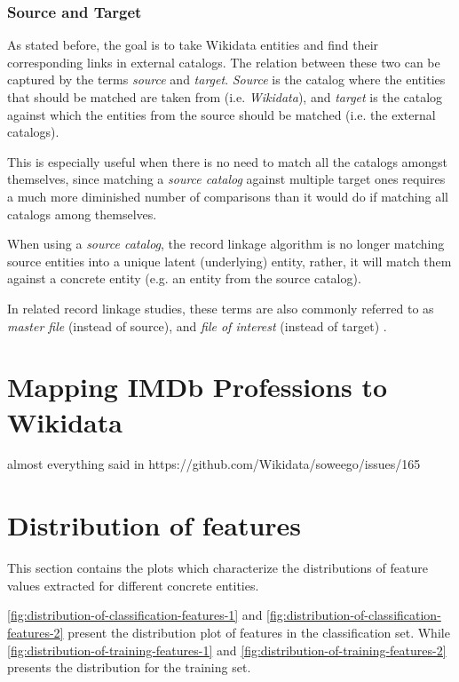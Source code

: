 \documentclass[epsfig,a4paper,11pt,titlepage,twoside,openany]{book}
\begin{document}
\subsubsection{Source and Target}
\label{sec:rl-term-source-and-target}

As stated before, the goal is to take Wikidata entities and find their corresponding links in external catalogs. The relation between these two can be captured by the terms \textit{source} and \textit{target}. \textit{Source} is the catalog where the entities that should be matched are taken from (i.e. \textit{Wikidata}), and \textit{target} is the catalog against which the entities from the source should be matched (i.e. the external catalogs).

This is especially useful when there is no need to match all the catalogs amongst
themselves, since matching a \textit{source catalog} against multiple target ones
requires a much more diminished number of comparisons than it would do if matching all catalogs among themselves.

When using a \textit{source catalog}, the record linkage algorithm is no longer matching
source entities into a unique latent (underlying) entity, rather, it will match
them against a concrete entity (e.g. an entity from the source catalog).

In related record linkage studies, these terms are also commonly referred to as \cite{Sayers2015}
\textit{master file} (instead of source), and \textit{file of interest} (instead
of target) .
   

\section{Mapping IMDb Professions to Wikidata}
\label{sec:imdb-profs-to-wikidata}

almost everything said in https://github.com/Wikidata/soweego/issues/165


\section{Distribution of features}
\label{sec:apx-feature-distribution}

This section contains the plots which characterize the distributions of feature values extracted for different concrete entities. 

\autoref{fig:distribution-of-classification-features-1} and \autoref{fig:distribution-of-classification-features-2} present the distribution plot of features in the classification set. While \autoref{fig:distribution-of-training-features-1} and \autoref{fig:distribution-of-training-features-2} presents the distribution for the training set.
\end{document}
